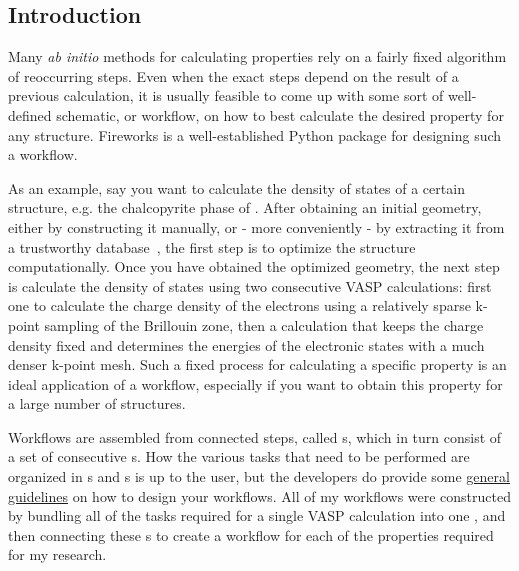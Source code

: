 \begin{refsection}
\pagebreak 
 
\section{Introduction} \label{automation:sec-intro} 
 
Many \textit{ab initio} methods for calculating properties rely on a fairly 
fixed algorithm of reoccurring steps. Even when the exact steps depend on the 
result of a previous calculation, it is usually feasible to come up with some 
sort of well-defined schematic, or workflow, on how to best calculate the 
desired property for any structure. Fireworks is a well-established Python 
package for designing such a workflow. 
 
As an example, say you want to calculate the density of states of a certain 
structure, e.g. the chalcopyrite phase of . After obtaining an 
initial geometry, either by constructing it manually, or - more conveniently - 
by extracting it from a trustworthy database~\cite{Jain2013}, the first step 
is to optimize the structure computationally. Once you have obtained the 
optimized geometry, the next step is calculate the density of states using two 
consecutive VASP calculations: first one to calculate the charge 
density of the electrons using a relatively sparse k-point sampling of the 
Brillouin zone, then a calculation that keeps the charge density fixed and 
determines the energies of the electronic states with a much denser k-point 
mesh. Such a fixed process for calculating a specific property is an ideal 
application of a workflow, especially if you want to obtain this property for 
a large number of structures.  
 
Workflows are assembled from connected steps, called 
\href{https://github.com/materialsproject/fireworks/blob/master/fireworks/core/firework.py#L196}{}s, 
which in turn consist of a set of consecutive 
\href{https://github.com/materialsproject/fireworks/blob/master/fireworks/core/firework.py#L46}{}s. 
How the various tasks that need to be performed are organized in 
s and s is up to the user, but the developers do 
provide some 
\href{https://materialsproject.github.io/fireworks/design_tips.html}{general 
guidelines} on how to design your workflows. All of my workflows were 
constructed by bundling all of the tasks required for a single VASP 
calculation into one , and then connecting these 
s to create a workflow for each of the properties required for 
my research. 
 

\end{refsection}
